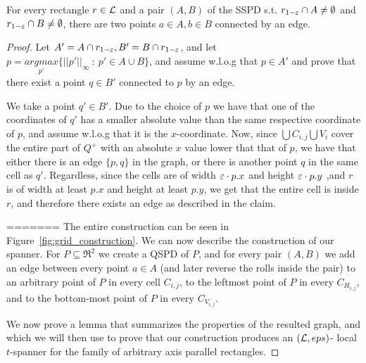 \documentclass[12pt]{article}%
\begin{document}
\begin{claim}
    For every rectangle $r\in \mathcal{L}$ and a pair $(A,B)$ of the SSPD
    s.t. $r_{1-\varepsilon}\cap A \neq \emptyset$ and
    $r_{1-\varepsilon}\cap B \neq \emptyset$, there are two points
    $a\in A, b\in B$ connected by an edge.
\end{claim}

\begin{proof}
    Let $A'=A\cap r_{1-\varepsilon}, B'=B \cap r_{1-\varepsilon}$, and let
    $p= \underset{p'}{argmax}\{||p'||_{\infty}~:~ p'\in A\cup B\}$,
    and assume w.l.o.g that $p\in A'$ and prove that there exist a
    point $q\in B'$ connected to $p$ by an edge.
    
    We take a point $q'\in B'$. Due to the choice of $p$ we have that
    one of the coordinates of $q'$ has a smaller absolute value than
    the same respective coordinate of $p$, and assume w.l.o.g that it
    is the $x$-coordinate. Now, since $\bigcup C_{i,j} \bigcup V_i$
    cover the entire part of $Q^+$ with an absolute $x$ value lower
    that that of $p$, we have that either there is an edge $\{p,q\}$
    in the graph, or there is another point $q$ in the same cell as
    $q'$. Regardless, since the cells are of width $\varepsilon\cdot p.x$ and
    height $\varepsilon\cdot p.y$ ,and $r$ is of width at least $p.x$ and
    height at least $p.y$, we get that the entire cell is inside $r$,
    and therefore there exists an edge as described in the claim.
    
=======
The entire construction can be seen in Figure~\ref{fig:grid_construction}. We can now describe the construction of our spanner. For $P\subseteq \Re^2$ we create a QSPD of $P$, and for every pair $(A,B)$ we add an edge between every point $a\in A$ (and later reverse the rolls inside the pair) to an arbitrary point of $P$ in every cell $C_{i,j}$, to the leftmost point of $P$ in every $C_{H_{i,j}}$, and to the bottom-most point of $P$ in every $C_{V_{i,j}}$.

We now prove a lemma that summarizes the properties of the resulted graph, and which we will then use to prove that our construction produces an $(\mathcal{L}, eps)$- local $t$-spanner for the family of arbitrary axis parallel rectangles. 


\end{proof}
\end{document}
